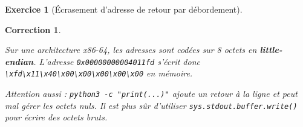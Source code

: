 \documentclass[a4paper,11pt]{article}
\theoremstyle{plain}
\newtheorem{correction}{Correction}
\theoremstyle{definition}
\newtheorem{exercice}{Exercice}
\begin{document}
\begin{exercice}[Écrasement d'adresse de retour par débordement]
\begin{correction}
\begin{attention}
Sur une architecture x86-64, les adresses sont codées sur 8 octets en \textbf{little-endian}. L'adresse \texttt{0x00000000004011fd} s'écrit donc \texttt{\textbackslash xfd\textbackslash x11\textbackslash x40\textbackslash x00\textbackslash x00\textbackslash x00\textbackslash x00\textbackslash x00} en mémoire.

Attention aussi : \texttt{python3 -c "print(...)"} ajoute un retour à la ligne et peut mal gérer les octets nuls. Il est plus sûr d'utiliser \texttt{sys.stdout.buffer.write()} pour écrire des octets bruts.
\end{attention}
\end{correction}

\end{exercice}


\end{document}
